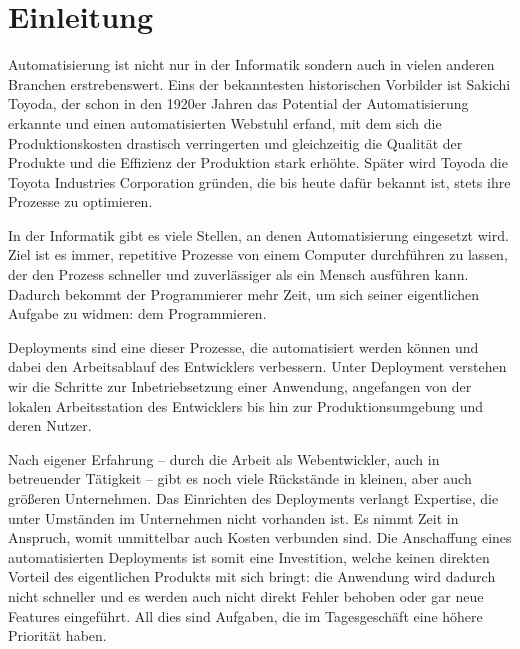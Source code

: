 
\chapter{Einleitung}
\label{ch:einleitung}

Automatisierung ist nicht nur in der Informatik sondern auch in vielen anderen Branchen erstrebenswert. Eins der bekanntesten historischen Vorbilder ist Sakichi Toyoda, der schon in den 1920er Jahren das Potential der Automatisierung erkannte und einen automatisierten Webstuhl erfand, mit dem sich die Produktionskosten drastisch verringerten und gleichzeitig die Qualität der Produkte und die Effizienz der Produktion stark erhöhte. Später wird Toyoda die Toyota Industries Corporation gründen, die bis heute dafür bekannt ist, stets ihre Prozesse zu optimieren.

In der Informatik gibt es viele Stellen, an denen Automatisierung eingesetzt wird. Ziel ist es immer, repetitive Prozesse von einem Computer durchführen zu lassen, der den Prozess schneller und zuverlässiger als ein Mensch ausführen kann. Dadurch bekommt der Programmierer mehr Zeit, um sich seiner eigentlichen Aufgabe zu widmen: dem Programmieren.

Deployments sind eine dieser Prozesse, die automatisiert werden können und dabei den Arbeitsablauf des Entwicklers verbessern. Unter Deployment verstehen wir die Schritte zur Inbetriebsetzung einer Anwendung, angefangen von der lokalen Arbeitsstation des Entwicklers bis hin zur Produktionsumgebung und deren Nutzer.

Nach eigener Erfahrung – durch die Arbeit als Webentwickler, auch in betreuender Tätigkeit – gibt es noch viele Rückstände in kleinen, aber auch größeren Unternehmen. Das Einrichten des Deployments verlangt Expertise, die unter Umständen im Unternehmen nicht vorhanden ist. Es nimmt Zeit in Anspruch, womit unmittelbar auch Kosten verbunden sind. Die Anschaffung eines automatisierten Deployments ist somit eine Investition, welche keinen direkten Vorteil des eigentlichen Produkts mit sich bringt: die Anwendung wird dadurch nicht schneller und es werden auch nicht direkt Fehler behoben oder gar neue Features eingeführt. All dies sind Aufgaben, die im Tagesgeschäft eine höhere Priorität haben.

